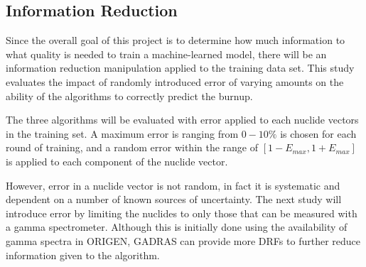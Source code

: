 \subsection{Information Reduction}
\label{sec:inforeduc}

Since the overall goal of this project is to determine how much information to
what quality is needed to train a machine-learned model, there will be an 
information reduction manipulation applied to the training data set. This study 
evaluates the impact of randomly introduced error of varying amounts on the 
ability of the algorithms to correctly predict the burnup. 

The three algorithms will be evaluated with error applied to each nuclide
vectors in the training set.  A maximum error is ranging from $0 - 10\%$ is
chosen for each round of training, and a random error within the range of
$[1-E_{max}, 1+E_{max}]$ is applied to each component of the nuclide vector.

However, error in a nuclide vector is not random, in fact it is systematic and
dependent on a number of known sources of uncertainty. The next study will
introduce error by limiting the nuclides to only those that can be measured
with a gamma spectrometer. Although this is initially done using the
availability of gamma spectra in \gls{ORIGEN}, \gls{GADRAS} can provide more
\gls{DRF}s to further reduce information given to the algorithm.


